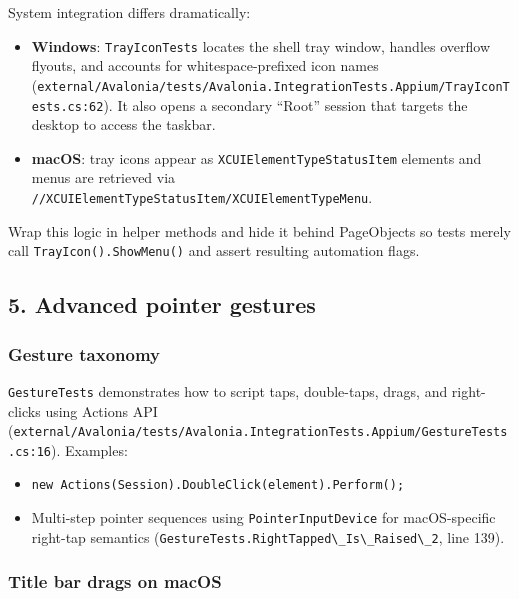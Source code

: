 System integration differs dramatically:

\begin{itemize}
\tightlist
\item
  \textbf{Windows}: \passthrough{\lstinline!TrayIconTests!} locates the
  shell tray window, handles overflow flyouts, and accounts for
  whitespace-prefixed icon names
  (\passthrough{\lstinline!external/Avalonia/tests/Avalonia.IntegrationTests.Appium/TrayIconTests.cs:62!}).
  It also opens a secondary ``Root'' session that targets the desktop to
  access the taskbar.
\item
  \textbf{macOS}: tray icons appear as
  \passthrough{\lstinline!XCUIElementTypeStatusItem!} elements and menus
  are retrieved via
  \passthrough{\lstinline!//XCUIElementTypeStatusItem/XCUIElementTypeMenu!}.
\end{itemize}

Wrap this logic in helper methods and hide it behind PageObjects so
tests merely call \passthrough{\lstinline!TrayIcon().ShowMenu()!} and
assert resulting automation flags.

\subsection{5. Advanced pointer
gestures}\label{advanced-pointer-gestures}

\subsubsection{Gesture taxonomy}\label{gesture-taxonomy}

\passthrough{\lstinline!GestureTests!} demonstrates how to script taps,
double-taps, drags, and right-clicks using Actions API
(\passthrough{\lstinline!external/Avalonia/tests/Avalonia.IntegrationTests.Appium/GestureTests.cs:16!}).
Examples:

\begin{itemize}
\tightlist
\item
  \passthrough{\lstinline!new Actions(Session).DoubleClick(element).Perform();!}
\item
  Multi-step pointer sequences using
  \passthrough{\lstinline!PointerInputDevice!} for macOS-specific
  right-tap semantics
  (\passthrough{\lstinline!GestureTests.RightTapped\_Is\_Raised\_2!},
  line 139).
\end{itemize}

\subsubsection{Title bar drags on macOS}\label{title-bar-drags-on-macos}

